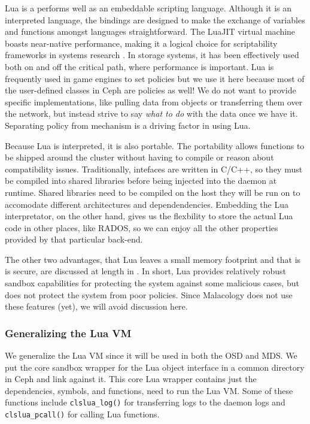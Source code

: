 \documentclass[10pt,twocolumn]{article}
\begin{document}
Lua is a performs well as an embeddable scripting language. Although it
is an interpreted language, the bindings are designed to make the
exchange of variables and functions amongst languages straightforward.
The LuaJIT virtual machine boasts near-native performance, making it a
logical choice for scriptability frameworks in systems research
\autocite{neto:dls14-luaos}. In storage systems, it has been effectively
used both on \autocites[
]{grawinkel:pdsw2012-lua}{watkins2013:bdmc13-in-vivo} and off
\autocite{sevilla:sc15-mantle} the critical path, where performance is
important. Lua is frequently used in game engines to set policies but we
use it here because most of the user-defined classes in Ceph are
policies as well! We do not want to provide specific implementations,
like pulling data from objects or transferring them over the network,
but instead strive to say \emph{what to do} with the data once we have
it. Separating policy from mechanism is a driving factor in using Lua.

Because Lua is interpreted, it is also portable. The portability allows
functions to be shipped around the cluster without having to compile or
reason about compatibility issues. Traditionally, intefaces are written
in C/C++, so they must be compiled into shared libraries before being
injected into the daemon at runtime. Shared libraries need to be
compiled on the host they will be run on to accomodate different
architectures and dependendencies. Embedding the Lua interpretator, on
the other hand, gives us the flexbility to store the actual Lua code in
other places, like RADOS, so we can enjoy all the other properties
provided by that particular back-end.

The other two advantages, that Lua leaves a small memory footprint and
that is is secure, are discussed at length in \autocites[
]{ierusalimschy_programming_2006}{neto:dls14-luaos}. In short, Lua
provides relatively robust sandbox capabilities for protecting the
system against some malicious cases, but does not protect the system
from poor policies. Since Malacology does not use these features (yet),
we will avoid discussion here.

\subsubsection{Generalizing the Lua VM}\label{generalizing-the-lua-vm}

We generalize the Lua VM since it will be used in both the OSD and MDS.
We put the core sandbox wrapper for the Lua object interface in a common
directory in Ceph and link against it. This core Lua wrapper contains
just the dependencies, symbols, and functions, need to run the Lua VM.
Some of these functions include \texttt{clslua\_log()} for transferring
logs to the daemon logs and \texttt{clslua\_pcall()} for calling Lua
functions.
\end{document}
